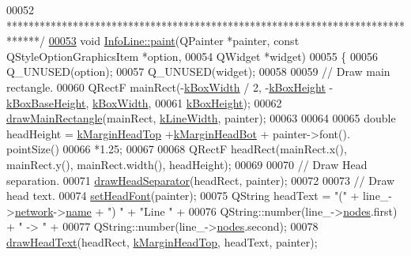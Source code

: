 \begin{DoxyCode}
00052 \textcolor{comment}{ ******************************************************************************/}
\hypertarget{infoline_8cpp_source_l00053}{}\hyperlink{class_info_line_ac696c9944716774dfe85a40ac5a434e1}{00053} \textcolor{keywordtype}{void} \hyperlink{class_info_line_ac696c9944716774dfe85a40ac5a434e1}{InfoLine::paint}(QPainter *painter, \textcolor{keyword}{const} QStyleOptionGraphicsItem *option,
00054                      QWidget *widget)
00055 \{
00056   Q\_UNUSED(option);
00057   Q\_UNUSED(widget);
00058 
00059   \textcolor{comment}{// Draw main rectangle.}
00060   QRectF mainRect(-\hyperlink{class_info_line_a33821aa140dc03829357d4006e9c153c}{kBoxWidth} / 2, -\hyperlink{class_info_line_a9e459549795bab79ae3b6c184dc78a00}{kBoxHeight} - 
      \hyperlink{class_info_line_ab50f47aa54c45def219859e9da3755e6}{kBoxBaseHeight}, \hyperlink{class_info_line_a33821aa140dc03829357d4006e9c153c}{kBoxWidth},
00061                   \hyperlink{class_info_line_a9e459549795bab79ae3b6c184dc78a00}{kBoxHeight});
00062   \hyperlink{class_info_line_a3a0f83ad98fe674513dab679e22cba42}{drawMainRectangle}(mainRect, \hyperlink{class_info_line_ad072bc8ef178113c36c3d480c7d637ac}{kLineWidth}, painter);
00063 
00064 
00065   \textcolor{keywordtype}{double} headHeight = \hyperlink{class_info_line_a73e02db68396f0c4b66d0cf80bd37c83}{kMarginHeadTop} +\hyperlink{class_info_line_a82ed1944ec4a41af19e377a243c2332d}{kMarginHeadBot} + painter->font().
      pointSize()
00066                       *1.25;
00067 
00068   QRectF headRect(mainRect.x(), mainRect.y(), mainRect.width(), headHeight);
00069 
00070   \textcolor{comment}{// Draw Head separation.}
00071   \hyperlink{class_info_line_a53e9012a9cef4f07f1d4872c6d250c08}{drawHeadSeparator}(headRect, painter);
00072 
00073   \textcolor{comment}{// Draw head text.}
00074   \hyperlink{class_info_line_a389ea4f5085b60d03022b94e636f11d1}{setHeadFont}(painter);
00075   QString headText = \textcolor{stringliteral}{"("} + line\_->\hyperlink{class_line_aefdf6a6c3e3775b5a16b344c1d33964e}{network}->\hyperlink{class_network_ab6643733a517f930c60b06f5ffd78186}{name} + \textcolor{stringliteral}{") "} + \textcolor{stringliteral}{"Line "} +
00076                      QString::number(line\_->\hyperlink{class_line_afd17c40d656e6a8d677cb22df5f0c70b}{nodes}.first) + \textcolor{stringliteral}{" -> "} +
00077                      QString::number(line\_->\hyperlink{class_line_afd17c40d656e6a8d677cb22df5f0c70b}{nodes}.second);
00078   \hyperlink{class_info_line_a043932fa92604badc063e09691195609}{drawHeadText}(headRect, \hyperlink{class_info_line_a73e02db68396f0c4b66d0cf80bd37c83}{kMarginHeadTop}, headText, painter);

\end{DoxyCode}
